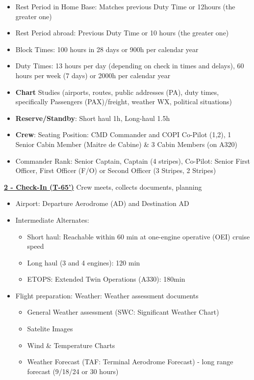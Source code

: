 \documentclass[9pt, landscape, fleqn]{scrartcl}
\begin{document}
\begin{multicols*}{3}
\begin{itemize}
    \item Rest Period in Home Base: Matches previous Duty Time or 12hours (the greater one)
    \item Rest Period abroad: Previous Duty Time or 10 hours (the greater one)
    \item Block Times: 100 hours in 28 days or 900h per calendar year 
    \item Duty Times: 13 hours per day (depending on check in times and delays), 60 hours per week (7 days) or 2000h per calendar year
    \item \textbf{Chart} Studies (airports, routes, public addresses (PA), duty times, specifically Passengers (PAX)/freight, weather WX, political situations)
    \item \textbf{Reserve/Standby}: Short haul 1h, Long-haul 1.5h
    \item \textbf{Crew}: Seating Position: CMD Commander and COPI Co-Pilot (1,2), 1 Senior Cabin Member (Maitre de Cabine) \& 3 Cabin Members (on A320)
    \item Commander Rank: Senior Captain, Captain (4 stripes), Co-Pilot: Senior First Officer, First Officer (F/O) or Second Officer (3 Stripes, 2 Stripes)
\end{itemize}
\underline{\textbf{2 - Check-In (T-65')}}
Crew meets, collects documents, planning
\begin{itemize}
    \item Airport: Departure Aerodrome (AD) and Destination AD
    \item Intermediate Alternates: 
    \begin{itemize}
        \item Short haul: Reachable within 60 min at one-engine operative (OEI) cruise speed 
        \item Long haul (3 and 4 engines): 120 min 
        \item ETOPS: Extended Twin Operations (A330): 180min
    \end{itemize}
    \item Flight preparation: Weather: Weather assessment documents 
    \begin{itemize}
        \item General Weather assessment (SWC: Significant Weather Chart)
        \item Satelite Images 
        \item Wind \& Temperature Charts 
        \item Weather Forecast (TAF: Terminal Aerodrome Forecast) - long range forecast (9/18/24 or 30 hours)

\end{itemize}
\end{itemize}
\end{multicols*}
\end{document}
